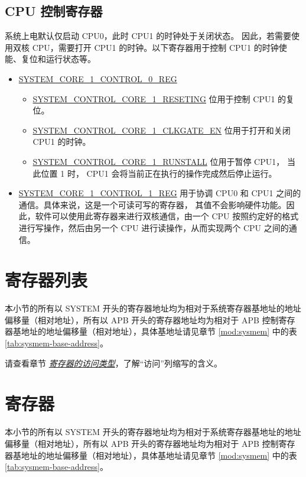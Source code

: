 \documentclass[main\_\_CN.tex]{subfiles}
\begin{document}
\subsection{CPU 控制寄存器}
系统上电默认仅启动 CPU0，此时 CPU1 的时钟处于关闭状态。 因此，若需要使用双核 CPU，需要打开 CPU1 的时钟。以下寄存器用于控制 CPU1 的时钟使能、复位和运行状态等。
\begin{itemize}
    \item \hyperref[regdesc:SYSTEMCORE1CONTROL0REG]{SYSTEM\_CORE\_1\_CONTROL\_0\_REG}
    \begin{itemize}
        \item \hyperref[fielddesc:SYSTEMCONTROLCORE1RESETING]{SYSTEM\_CONTROL\_CORE\_1\_RESETING} 位用于控制 CPU1 的复位。
    \item \hyperref[fielddesc:SYSTEMCONTROLCORE1CLKGATEEN]{SYSTEM\_CONTROL\_CORE\_1\_CLKGATE\_EN} 位用于打开和关闭 CPU1 的时钟。
    \item \hyperref[fielddesc:SYSTEMCONTROLCORE1RUNSTALL]{SYSTEM\_CONTROL\_CORE\_1\_RUNSTALL} 位用于暂停 CPU1， 当此位置 1 时， CPU1 会将当前正在执行的操作完成然后停止运行。
    \end{itemize}
    \item \hyperref[regdesc:SYSTEMCORE1CONTROL1REG]{SYSTEM\_CORE\_1\_CONTROL\_1\_REG} 用于协调 CPU0 和 CPU1 之间的通信。具体来说，这是一个可读可写的寄存器， 其值不会影响硬件功能。因此，软件可以使用此寄存器来进行双核通信，由一个 CPU 按照约定好的格式进行写操作，然后由另一个 CPU 进行读操作，从而实现两个 CPU 之间的通信。
\end{itemize}


\clearpage
\section{寄存器列表}
\hypertarget{sysreg-reg-summ}{}
\label{sec:sysreg-reg-summ}

本小节的所有以 SYSTEM 开头的寄存器地址均为相对于系统寄存器基地址的地址偏移量（相对地址），所有以 APB 开头的寄存器地址均为相对于 APB 控制寄存器基地址的地址偏移量（相对地址），具体基地址请见章节 \ref{mod:sysmem} \textit{} 中的表 \ref{tab:sysmem-base-address}。

请查看章节 \hyperref[glossary-access-types]{\textit{寄存器的访问类型}}，了解“访问”列缩写的含义。





\clearpage
\section{寄存器}

本小节的所有以 SYSTEM 开头的寄存器地址均为相对于系统寄存器基地址的地址偏移量（相对地址），所有以 APB 开头的寄存器地址均为相对于 APB 控制寄存器基地址的地址偏移量（相对地址），具体基地址请见章节 \ref{mod:sysmem} \textit{} 中的表 \ref{tab:sysmem-base-address}。



\end{document}
